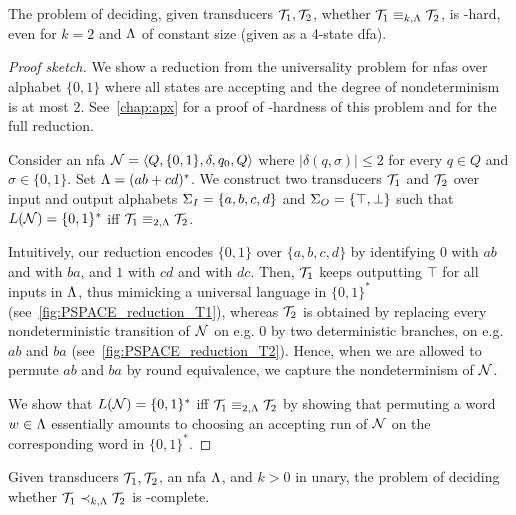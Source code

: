 \begin{theorem}
\label{thm:equivalence_PSPACE-H}
The problem of deciding, given transducers $\mathcal{T}_1,\mathcal{T}_2$, whether $\mathcal{T}_1\equiv_{k,\Lambda} \mathcal{T}_2$, is \PSPACE-hard, even for $k=2$ and $\Lambda$ of constant size (given as a 4-state \gls{dfa}).
\end{theorem}
\begin{proof}[Proof sketch]
We show a reduction from the universality problem for \glspl{nfa} over alphabet $\{0,1\}$ where all states are accepting and the degree of nondeterminism is at most 2. See~\cref{chap:apx} for a proof of \PSPACE-hardness of this problem and for the full reduction.

Consider an \gls{nfa} $\mathcal{N}=\left< Q,\{0,1\},\delta,q_0,Q\right>$ where $|\delta(q,\sigma)|\le 2$ for every $q\in Q$ and $\sigma\in \{0,1\}$. Set $\Lambda=(ab+cd)^*$. We construct two transducers $\mathcal{T}_1$ and $\mathcal{T}_2$ over input and output alphabets $\Sigma_{I}=\{a,b,c,d\}$ and $\Sigma_{O}=\{\top,\bot\}$ such that $L(\mathcal{N})=\{0,1\}^*$ iff $\mathcal{T}_1\equiv_{2,\Lambda}\mathcal{T}_2$. 

Intuitively, our reduction encodes $\{0,1\}$ over $\{a,b,c,d\}$ by identifying $0$ with $ab$ and with $ba$, and $1$ with $cd$ and with $dc$. Then, $\mathcal{T}_1$ keeps outputting $\top$ for all inputs in $\Lambda$, thus mimicking a universal language in $\{0,1\}^*$ (see~\cref{fig:PSPACE_reduction_T1}), whereas $\mathcal{T}_2$ is obtained by replacing every nondeterministic transition of $\mathcal{N}$ on e.g. 0 by two deterministic branches, on e.g. $ab$ and $ba$ (see~\cref{fig:PSPACE_reduction_T2}). Hence, when we are allowed to permute $ab$ and $ba$ by round equivalence, we capture the nondeterminism of $\mathcal{N}$.

We show that $L(\mathcal{N})=\{0,1\}^*$ iff $\mathcal{T}_1\equiv_{2,\Lambda}\mathcal{T}_2$ by showing that
permuting a word $w\in \Lambda$ essentially amounts to choosing an accepting run of $\mathcal{N}$ on the corresponding word in $\{0,1\}^*$.
\end{proof}

\begin{corollary}
\label{cor:PSPACE-C}
Given transducers $\mathcal{T}_1,\mathcal{T}_2$, an \gls{nfa} $\Lambda$, and $k>0$ in unary, the problem of deciding whether $\mathcal{T}_1\prec_{k,\Lambda}\mathcal{T}_2$ is \PSPACE-complete.
\end{corollary}
